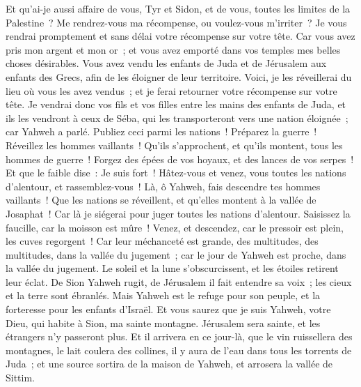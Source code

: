 \begin{multicols}{2}
Et qu'ai-je aussi affaire de vous, Tyr et Sidon, et de vous, toutes les limites de la Palestine~? Me rendrez-vous ma récompense, ou voulez-vous m'irriter~? Je vous rendrai promptement et sans délai votre récompense sur votre tête.
Car vous avez pris mon argent et mon or~; et vous avez emporté dans vos temples mes belles choses désirables.
Vous avez vendu les enfants de Juda et de Jérusalem aux enfants des Grecs, afin de les éloigner de leur territoire.
Voici, je les réveillerai du lieu où vous les avez vendus~; et je ferai retourner votre récompense sur votre tête.
Je vendrai donc vos fils et vos filles entre les mains des enfants de Juda, et ils les vendront à ceux de Séba, qui les transporteront vers une nation éloignée~; car Yahweh a parlé.
Publiez ceci parmi les nations~! Préparez la guerre~! Réveillez les hommes vaillants~! Qu'ils s'approchent, et qu'ils montent, tous les hommes de guerre~!
Forgez des épées de vos hoyaux, et des lances de vos serpes~! Et que le faible dise~: Je suis fort~!
Hâtez-vous et venez, vous toutes les nations d'alentour, et rassemblez-vous~! Là, ô Yahweh, fais descendre tes hommes vaillants~!
Que les nations se réveillent, et qu'elles montent à la vallée de Josaphat~! Car là je siégerai pour juger toutes les nations d'alentour.
Saisissez la faucille, car la moisson est mûre~! Venez, et descendez, car le pressoir est plein, les cuves regorgent~! Car leur méchanceté est grande,
des multitudes, des multitudes, dans la vallée du jugement~; car le jour de Yahweh est proche, dans la vallée du jugement.
Le soleil et la lune s'obscurcissent, et les étoiles retirent leur éclat.
De Sion Yahweh rugit, de Jérusalem il fait entendre sa voix~; les cieux et la terre sont ébranlés. Mais Yahweh est le refuge pour son peuple, et la forteresse pour les enfants d'Israël.
Et vous saurez que je suis Yahweh, votre Dieu, qui habite à Sion, ma sainte montagne. Jérusalem sera sainte, et les étrangers n'y passeront plus.
Et il arrivera en ce jour-là, que le vin ruissellera des montagnes, le lait coulera des collines, il y aura de l'eau dans tous les torrents de Juda~; et une source sortira de la maison de Yahweh, et arrosera la vallée de Sittim.

\end{multicols}
